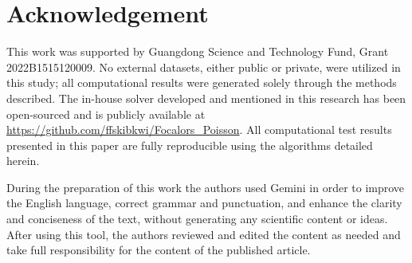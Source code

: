 \documentclass[preprint]{elsarticle}
\begin{document}
\section*{Acknowledgement}
This work was supported by Guangdong Science and Technology Fund, Grant 2022B1515120009. No external datasets, either public or private, were utilized in this study; all computational results were generated solely through the methods described. The in-house solver developed and mentioned in this research has been open-sourced and is publicly available at \url{https://github.com/ffskibkwi/Focalors_Poisson}. All computational test results presented in this paper are fully reproducible using the algorithms detailed herein.\par

During the preparation of this work the authors used Gemini in order to improve the English language, correct grammar and punctuation, and enhance the clarity and conciseness of the text, without generating any scientific content or ideas. After using this tool, the authors reviewed and edited the content as needed and take full responsibility for the content of the published article.




\end{document}
